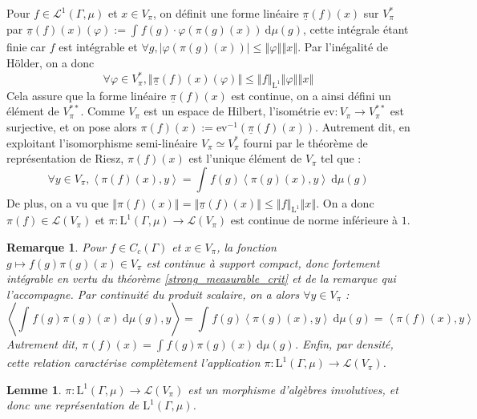 \documentclass[a4paper,12pt]{article}
\newtheorem{lemma}[theorem]{Lemme}
\newtheorem{remark}[theorem]{Remarque}
\newcommand{\ev}{\mathrm{ev}}
\newcommand{\norm}[1]{\left\Vert #1\right\Vert}
\newcommand{\abs}[1]{\left\vert#1\right\vert}
\newcommand{\ket}[1]{\left\langle #1 \right\rangle}
\newcommand{\integral}[4]{\int_{#1}^{#2} #3~\mathrm{d}#4}
\newcommand{\inv}{^{-1}}
\begin{document}
Pour $f\in\mathscr{L}^1(\Gamma, \mu)$ et $x\in V_\pi$, on définit une forme linéaire $\underline{\pi}(f)(x)$ sur $V_\pi^*$ par 
$\underline{\pi}(f)(x)(\varphi) := \integral{}{}{f(g)\cdot\varphi(\pi(g)(x))}{\mu(g)}$, cette intégrale étant finie car $f$ est
intégrable et $\forall g, \abs{\varphi(\pi(g)(x))}\le\norm{\varphi}\norm{x}$. Par l'inégalité de Hölder, on a donc 
\begin{equation*}
    \forall\varphi\in V_\pi^*, \norm{\underline{\pi}(f)(x)(\varphi)}\le\norm{f}_{\mathrm{L}^1}\norm{\varphi}\norm{x}
\end{equation*}
Cela assure que la forme linéaire $\underline{\pi}(f)(x)$ est continue, on a ainsi défini un élément de $V_\pi^{**}$. 
Comme $V_\pi$ est un espace de Hilbert, l'isométrie $\ev:V_\pi\to V_\pi^{**}$ est surjective, et on pose alors $\pi(f)(x) := \ev\inv(\underline{\pi}(f)(x))$. 
Autrement dit, en exploitant l'isomorphisme semi-linéaire $V_\pi\simeq V_\pi^*$ fourni par le théorème de représentation de Riesz, 
$\pi(f)(x)$ est l'unique élément de $V_\pi$ tel que :
\begin{equation*}
    \forall y\in V_\pi, \ket{\pi(f)(x), y} = \integral{}{}{f(g)\ket{\pi(g)(x), y}}{\mu(g)}
\end{equation*}
De plus, on a vu que $\norm{\pi(f)(x)} = \norm{\underline{\pi}(f)(x)} \le \norm{f}_{\mathrm{L}^1}\norm{x}$. 
On a donc $\pi(f)\in\mathcal{L}(V_\pi)$ et $\pi:\mathrm{L}^1(\Gamma, \mu)\to\mathcal{L}(V_\pi)$ est continue de norme inférieure à $1$.

\begin{remark}\label{L1_repr_Cc}
    Pour $f\in C_c(\Gamma)$ et $x\in V_\pi$, la fonction $g\mapsto f(g)\pi(g)(x)\in V_\pi$ est continue à support compact,
    donc fortement intégrable en vertu du théorème \ref{strong_measurable_crit} et de la remarque qui l'accompagne. 
    Par continuité du produit scalaire, on a alors $\forall y\in V_\pi$ : 
    \begin{equation*}
        \ket{\integral{}{}{f(g)\pi(g)(x)}{\mu(g)}, y} = \integral{}{}{f(g)\ket{\pi(g)(x), y}}{\mu(g)} = \ket{\pi(f)(x), y}
    \end{equation*}
    Autrement dit, $\pi(f)(x) = \integral{}{}{f(g)\pi(g)(x)}{\mu(g)}$. Enfin, par densité, cette relation caractérise complètement l'application $\pi:\mathrm{L}^1(\Gamma, \mu)\to\mathcal{L}(V_\pi)$.
\end{remark}

\begin{lemma}
    $\pi:\mathrm{L}^1(\Gamma, \mu)\to\mathcal{L}(V_\pi)$ est un morphisme d'algèbres involutives,
    et donc une représentation de $\mathrm{L}^1(\Gamma, \mu)$.
\end{lemma}
\end{document}
